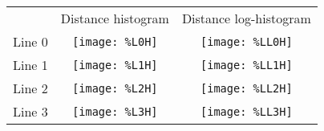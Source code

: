 \documentclass{article}
\begin{document}
%

\begin{figure}
\begin{tabular}{ccc}
        & Distance histogram & Distance log-histogram \\

        Line 0 &  
        \texttt{[image: \%L0H]} & 
        \texttt{[image: \%LL0H]} \\

        Line 1 &  
        \texttt{[image: \%L1H]} & 
        \texttt{[image: \%LL1H]} \\

        Line 2 &  
        \texttt{[image: \%L2H]} & 
        \texttt{[image: \%LL2H]} \\
        
        Line 3 &  
        \texttt{[image: \%L3H]} & 
        \texttt{[image: \%LL3H]} \\
    
\end{tabular}
\end{figure}
\end{document}
